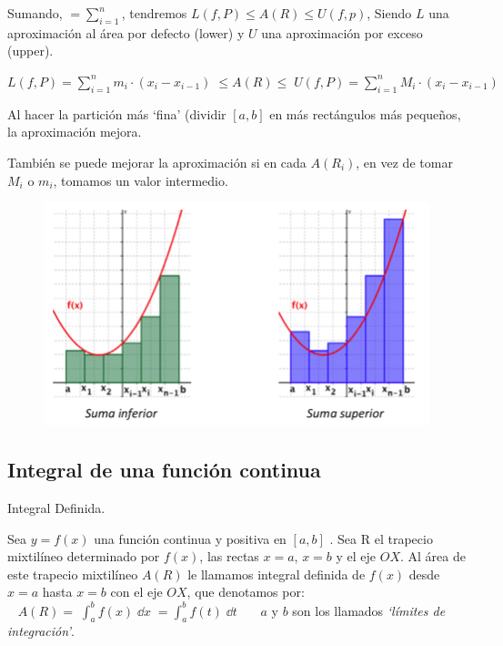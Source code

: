 Sumando, $=\sum _{ i=1 }^{ n }$, tendremos $L(f,P)\le A(R) \le U(f,p)$, Siendo $L$ una aproximación al área por defecto (lower) y $U$ una aproximación por exceso (upper).

$L(f,P)=\sum _{ i=1 }^{ n }{ m_i\cdot \left( { x }_{ i }-{ x }_{ i-1 } \right)  } \; \le A(R) \le  \;  U(f,P)=\sum _{ i=1 }^{ n }{ M_i\cdot \left( { x }_{ i }-{ x }_{ i-1 } \right)  } $

Al hacer la partición más `fina' (dividir $[a,b]$ en más rectángulos más pequeños, la aproximación mejora. 

También se puede mejorar la aproximación si en cada $A(R_i)$, en vez de tomar $M_i$ o $m_i$, tomamos un valor intermedio. 
\begin{figure}[H]
	\centering
	\includegraphics[width=.7\textwidth]{imagenes/imagenes08/T08IM09.png}
\end{figure}


\subsection{Integral de una función continua}

\begin{defi} Integral Definida.

Sea $y=f(x)$ una función continua y positiva en $[a,b]$ . Sea R el trapecio mixtilíneo determinado por $f(x)$, las rectas $x=a$,  $x=b$ y el eje $OX$. Al área de este trapecio mixtilíneo $A(R)$ le llamamos integral definida de $f(x)$ desde $x=a$ hasta  $x=b$  con el eje $OX$, que denotamos por:$\; \; \boxed{\displaystyle \; A(R) = \; \int_a^b f(x)\; \dd x \;= \int_a^b f(t)\; \dd t\; \  }\quad $ $a$ y $b$ son los llamados \emph{`límites de integración'}.
	
\end{defi}

